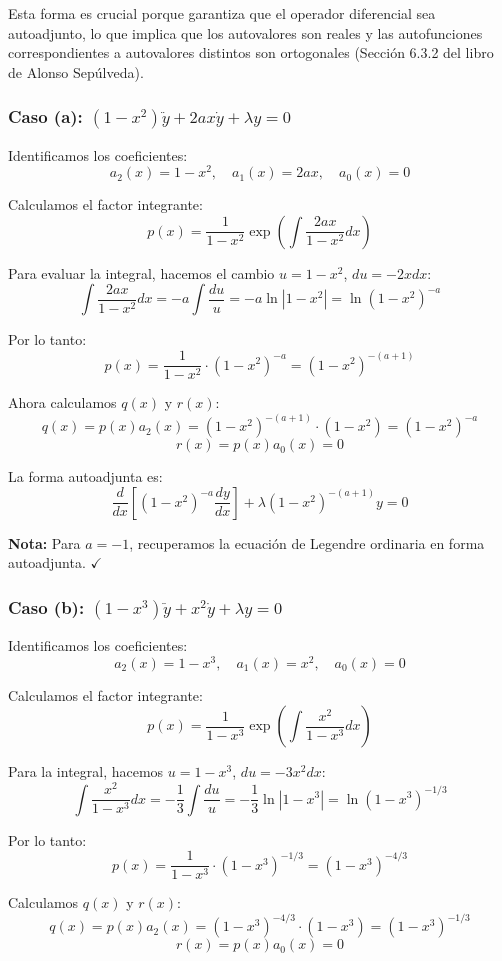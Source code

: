 \documentclass[a4paper]{article}
\begin{document}
Esta forma es crucial porque garantiza que el operador diferencial sea autoadjunto, lo que implica que los autovalores son reales y las autofunciones correspondientes a autovalores distintos son ortogonales (Sección 6.3.2 del libro de Alonso Sepúlveda).

\subsubsection{Caso (a): $(1 - x^2)\ddot{y} + 2ax\dot{y} + \lambda y = 0$}

Identificamos los coeficientes:
$$
a_2(x) = 1 - x^2, \quad a_1(x) = 2ax, \quad a_0(x) = 0
$$

Calculamos el factor integrante:
$$
p(x) = \frac{1}{1 - x^2} \exp\left(\int \frac{2ax}{1 - x^2} dx\right)
$$

Para evaluar la integral, hacemos el cambio $u = 1 - x^2$, $du = -2x dx$:
$$
\int \frac{2ax}{1 - x^2} dx = -a \int \frac{du}{u} = -a \ln|1 - x^2| = \ln(1 - x^2)^{-a}
$$

Por lo tanto:
$$
p(x) = \frac{1}{1 - x^2} \cdot (1 - x^2)^{-a} = (1 - x^2)^{-(a+1)}
$$

Ahora calculamos $q(x)$ y $r(x)$:
$$
q(x) = p(x)a_2(x) = (1 - x^2)^{-(a+1)} \cdot (1 - x^2) = (1 - x^2)^{-a}
$$
$$
r(x) = p(x)a_0(x) = 0
$$

La forma autoadjunta es:
$$
\boxed{\frac{d}{dx}\left[(1 - x^2)^{-a}\frac{dy}{dx}\right] + \lambda(1 - x^2)^{-(a+1)}y = 0}
$$

\textbf{Nota:} Para $a = -1$, recuperamos la ecuación de Legendre ordinaria en forma autoadjunta. $\checkmark$

\subsubsection{Caso (b): $(1 - x^3)\ddot{y} + x^2\dot{y} + \lambda y = 0$}

Identificamos los coeficientes:
$$
a_2(x) = 1 - x^3, \quad a_1(x) = x^2, \quad a_0(x) = 0
$$

Calculamos el factor integrante:
$$
p(x) = \frac{1}{1 - x^3} \exp\left(\int \frac{x^2}{1 - x^3} dx\right)
$$

Para la integral, hacemos $u = 1 - x^3$, $du = -3x^2 dx$:
$$
\int \frac{x^2}{1 - x^3} dx = -\frac{1}{3} \int \frac{du}{u} = -\frac{1}{3} \ln|1 - x^3| = \ln(1 - x^3)^{-1/3}
$$

Por lo tanto:
$$
p(x) = \frac{1}{1 - x^3} \cdot (1 - x^3)^{-1/3} = (1 - x^3)^{-4/3}
$$

Calculamos $q(x)$ y $r(x)$:
$$
q(x) = p(x)a_2(x) = (1 - x^3)^{-4/3} \cdot (1 - x^3) = (1 - x^3)^{-1/3}
$$
$$
r(x) = p(x)a_0(x) = 0
$$
\end{document}
